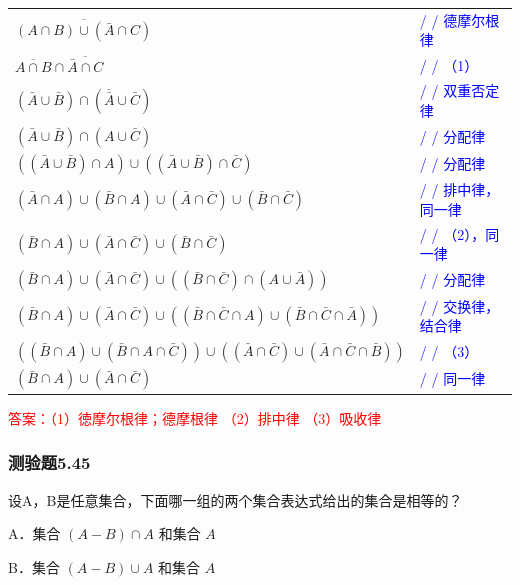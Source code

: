 \documentclass[UTF8, heading=true]{ctexart}
\begin{document}
\begin{table}[htbp]
  \centering
  \renewcommand{\arraystretch}{1.5}
\begin{tabular}{ll}
$\overline{(A \cap B) \cup(\bar{A} \cap C)}$ & \textcolor{blue}{/ / 德摩尔根律} \\
$\overline{A \cap B} \cap \overline{\bar{A} \cap C}$ & \textcolor{blue}{/ / （1）} \\
$(\bar{A} \cup \bar{B}) \cap(\overline{\bar{A}} \cup \bar{C})$ & \textcolor{blue}{/ / 双重否定律} \\
$(\bar{A} \cup \bar{B}) \cap(A \cup \bar{C})$ & \textcolor{blue}{/ / 分配律} \\
$((\bar{A} \cup \bar{B}) \cap A) \cup((\bar{A} \cup \bar{B}) \cap \bar{C})$ & \textcolor{blue}{/ / 分配律} \\
$(\bar{A} \cap A) \cup(\bar{B} \cap A) \cup(\bar{A} \cap \bar{C}) \cup(\bar{B} \cap \bar{C})$ & \textcolor{blue}{/ / 排中律，同一律} \\
$(\bar{B} \cap A) \cup(\bar{A} \cap \bar{C}) \cup(\bar{B} \cap \bar{C})$ & \textcolor{blue}{/ / （2），同一律} \\
$(\bar{B} \cap A) \cup(\bar{A} \cap \bar{C}) \cup((\bar{B} \cap \bar{C}) \cap(A \cup \bar{A}))$ & \textcolor{blue}{/ / 分配律} \\
$(\bar{B} \cap A) \cup(\bar{A} \cap \bar{C}) \cup((\bar{B} \cap \bar{C} \cap A) \cup(\bar{B} \cap \bar{C} \cap \bar{A}))$ & \textcolor{blue}{/ / 交换律，结合律} \\
$((\bar{B} \cap A) \cup(\bar{B} \cap A \cap \bar{C})) \cup((\bar{A} \cap \bar{C}) \cup(\bar{A} \cap \bar{C} \cap \bar{B}))$ & \textcolor{blue}{/ / （3）} \\
$(\bar{B} \cap A) \cup(\bar{A} \cap \bar{C})$ & \textcolor{blue}{/ / 同一律} \\
\end{tabular}
\end{table}



\textcolor{red}
{
  答案：（1）徳摩尔根律；德摩根律
  （2）排中律 
  （3）吸收律
}

\subsubsection{测验题5.45}

设A，B是任意集合，下面哪一组的两个集合表达式给出的集合是相等的？

A．集合 $(A-B) \cap A$ 和集合 $A$

B．集合 $(A-B) \cup A$ 和集合 $A$
\end{document}

